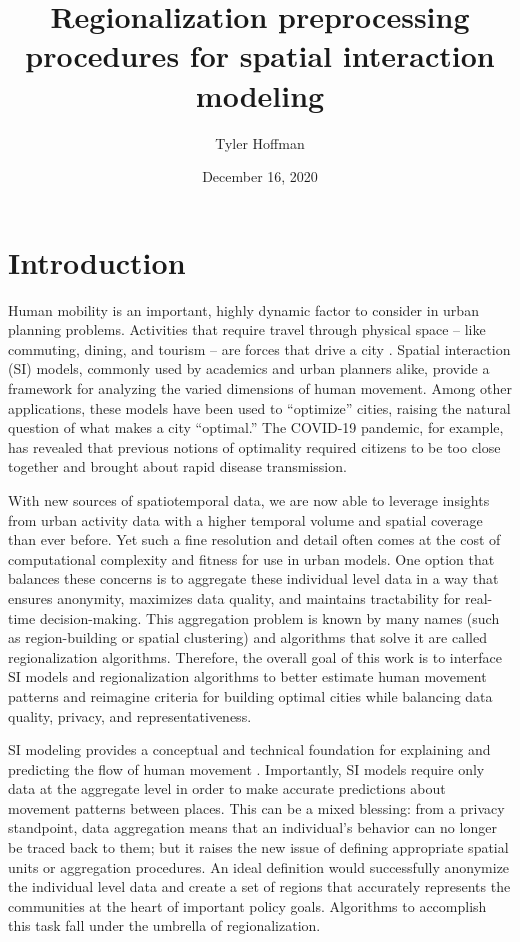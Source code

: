 \documentclass{article}
\title{\vspace{-1cm} Regionalization preprocessing procedures for spatial interaction modeling}
\author{Tyler Hoffman}
\date{December 16, 2020}
\begin{document}
    \maketitle\thispagestyle{fancy}

    \section{Introduction} \label{sec:intro}
    Human mobility is an important, highly dynamic factor to consider in urban planning problems. Activities that require travel through physical space -- like commuting, dining, and tourism -- are forces that drive a city \cite{Batty2013}. Spatial interaction (SI) models, commonly used by academics and urban planners alike, provide a framework for analyzing the varied dimensions of human movement. Among other applications, these models have been used to “optimize” cities, raising the natural question of what makes a city “optimal.” The COVID-19 pandemic, for example, has revealed that previous notions of optimality required citizens to be too close together and brought about rapid disease transmission. 

    With new sources of spatiotemporal data, we are now able to leverage insights from urban activity data with a higher temporal volume and spatial coverage than ever before. Yet such a fine resolution and detail often comes at the cost of computational complexity and fitness for use in urban models. One option that balances these concerns is to aggregate these individual level data in a way that ensures anonymity, maximizes data quality, and maintains tractability for real-time decision-making. This aggregation problem is known by many names (such as region-building or spatial clustering) and algorithms that solve it are called regionalization algorithms. Therefore, the overall goal of this work is to interface SI models and regionalization algorithms to better estimate human movement patterns and reimagine criteria for building optimal cities while balancing data quality, privacy, and representativeness.

    SI modeling provides a conceptual and technical foundation for explaining and predicting the flow of human movement \cite{Fotheringham1989,Oshan2016}. Importantly, SI models require only data at the aggregate level in order to make accurate predictions about movement patterns between places. This can be a mixed blessing: from a privacy standpoint, data aggregation means that an individual’s behavior can no longer be traced back to them; but it raises the new issue of defining appropriate spatial units or aggregation procedures. An ideal definition would successfully anonymize the individual level data and create a set of regions that accurately represents the communities at the heart of important policy goals. Algorithms to accomplish this task fall under the umbrella of regionalization.
\end{document}
